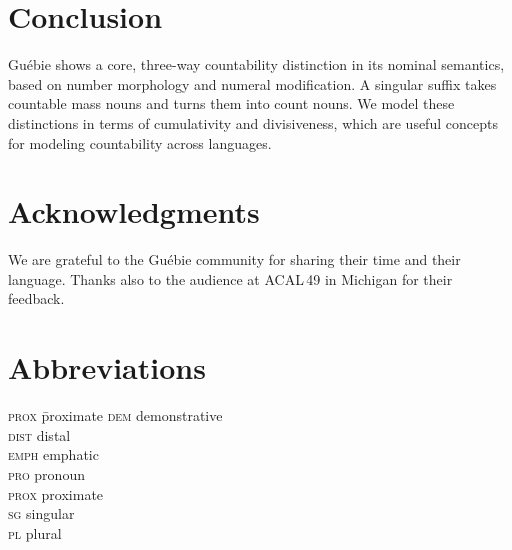 \documentclass[output=paper,colorlinks,citecolor=brown]{langscibook}
\begin{document}
\section{Conclusion}\label{sec:sande:5}

Guébie shows a core, three-way countability distinction in its nominal semantics, based on number morphology and numeral modification. A singular suffix takes countable mass nouns and turns them into count nouns. We model these distinctions in terms of cumulativity and divisiveness, which are useful concepts for modeling countability across languages.

\section*{Acknowledgments}

We are grateful to the Guébie community for sharing their time and their language. Thanks also to the audience at ACAL\,49 in Michigan for their feedback.

\section*{Abbreviations}
\begin{multicols}{3}
\begin{tabbing}
\textsc{prox} \hspace{1ex} \= proximate\kill
\textsc{dem} \> demonstrative\\
\textsc{dist} \> distal\\
\textsc{emph} \> emphatic\\
\textsc{pro} \> pronoun\\
\textsc{prox} \> proximate\\
\textsc{sg} \> singular\\
\textsc{pl} \> plural
\end{tabbing}
\end{multicols}\largerpage[2]
\end{document}
